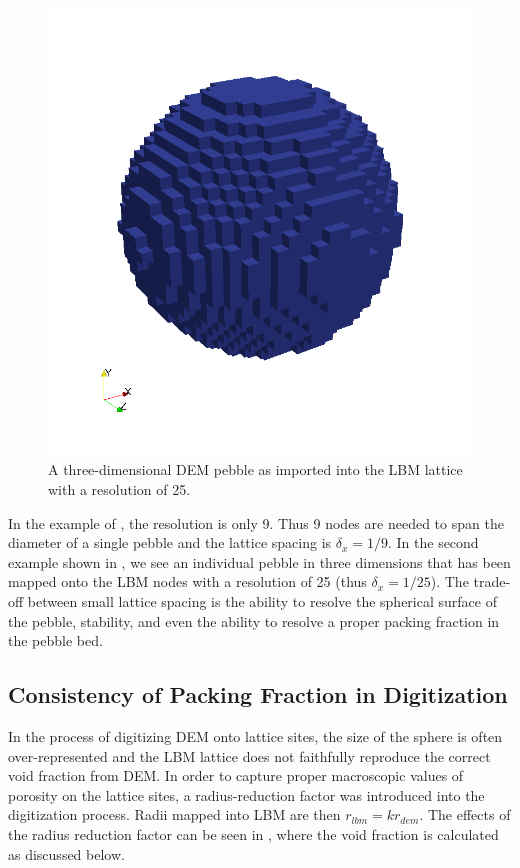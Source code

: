 \begin{figure}[ht]
	\centering
	\includegraphics[width=\doubleimagewidth]{figures/lbm/lbm-pebble-res25.png}
	\caption{A three-dimensional DEM pebble as imported into the LBM lattice with a resolution of 25.}\label{fig:dem-2-lbm-example2}
\end{figure}

In the example of , the resolution is only 9. Thus 9 nodes are needed to span the diameter of a single pebble and the lattice spacing is $\delta_x = 1/9$. In the second example shown in , we see an individual pebble in three dimensions that has been mapped onto the LBM nodes with a resolution of 25 (thus $\delta_x = 1/25$). The trade-off between small lattice spacing is the ability to resolve the spherical surface of the pebble, stability, and even the ability to resolve a proper packing fraction in the pebble bed. 







\FloatBarrier
\subsection{Consistency of Packing Fraction in Digitization}
In the process of digitizing DEM onto lattice sites, the size of the sphere is often over-represented and the LBM lattice does not faithfully reproduce the correct void fraction from DEM. In order to capture proper macroscopic values of porosity on the lattice sites, a radius-reduction factor was introduced into the digitization process. Radii mapped into LBM are then $r_{lbm} = k r_{dem}$. The effects of the radius reduction factor can be seen in , where the void fraction is calculated as discussed below.


